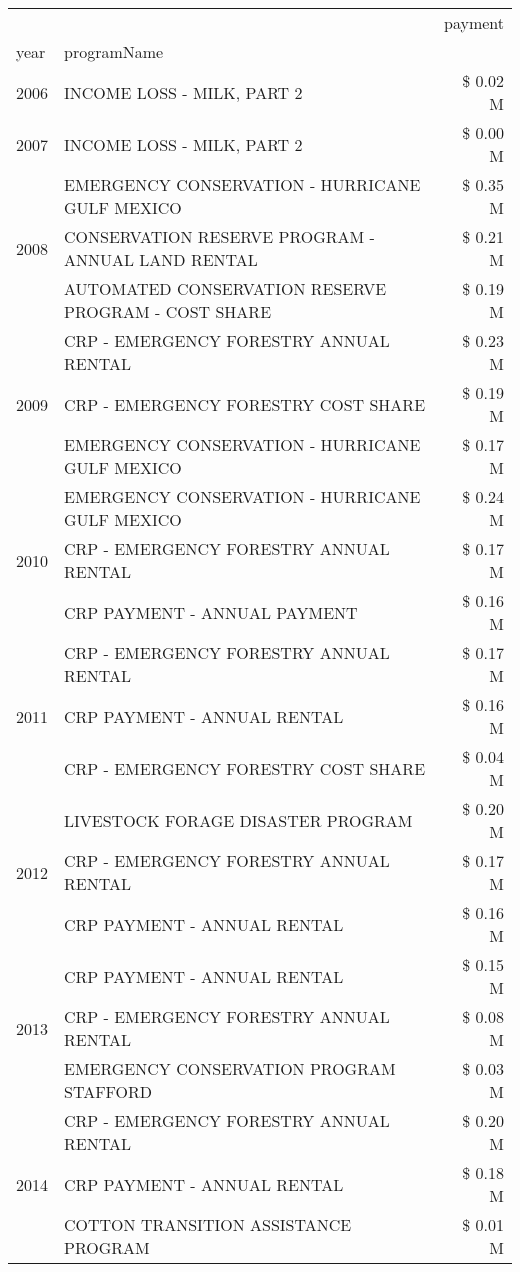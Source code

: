 \begin{tabular}{llr}
\toprule
 &  & payment \\
year & programName &  \\
\midrule
2006 & INCOME LOSS - MILK, PART 2 & \$ 0.02 M \\
\cline{1-3}
2007 & INCOME LOSS - MILK, PART 2 & \$ 0.00 M \\
\cline{1-3}
\multirow[t]{3}{*}{2008} & EMERGENCY CONSERVATION - HURRICANE GULF MEXICO & \$ 0.35 M \\
 & CONSERVATION RESERVE PROGRAM - ANNUAL LAND RENTAL & \$ 0.21 M \\
 & AUTOMATED CONSERVATION RESERVE PROGRAM - COST SHARE & \$ 0.19 M \\
\cline{1-3}
\multirow[t]{3}{*}{2009} & CRP - EMERGENCY FORESTRY ANNUAL RENTAL & \$ 0.23 M \\
 & CRP - EMERGENCY FORESTRY COST SHARE & \$ 0.19 M \\
 & EMERGENCY CONSERVATION - HURRICANE GULF MEXICO & \$ 0.17 M \\
\cline{1-3}
\multirow[t]{3}{*}{2010} & EMERGENCY CONSERVATION - HURRICANE GULF MEXICO & \$ 0.24 M \\
 & CRP - EMERGENCY FORESTRY ANNUAL RENTAL & \$ 0.17 M \\
 & CRP PAYMENT - ANNUAL PAYMENT & \$ 0.16 M \\
\cline{1-3}
\multirow[t]{3}{*}{2011} & CRP - EMERGENCY FORESTRY ANNUAL RENTAL & \$ 0.17 M \\
 & CRP PAYMENT - ANNUAL RENTAL & \$ 0.16 M \\
 & CRP - EMERGENCY FORESTRY COST SHARE & \$ 0.04 M \\
\cline{1-3}
\multirow[t]{3}{*}{2012} & LIVESTOCK FORAGE DISASTER PROGRAM & \$ 0.20 M \\
 & CRP - EMERGENCY FORESTRY ANNUAL RENTAL & \$ 0.17 M \\
 & CRP PAYMENT - ANNUAL RENTAL & \$ 0.16 M \\
\cline{1-3}
\multirow[t]{3}{*}{2013} & CRP PAYMENT - ANNUAL RENTAL & \$ 0.15 M \\
 & CRP - EMERGENCY FORESTRY ANNUAL RENTAL & \$ 0.08 M \\
 & EMERGENCY CONSERVATION PROGRAM STAFFORD & \$ 0.03 M \\
\cline{1-3}
\multirow[t]{3}{*}{2014} & CRP - EMERGENCY FORESTRY ANNUAL RENTAL & \$ 0.20 M \\
 & CRP PAYMENT - ANNUAL RENTAL & \$ 0.18 M \\
 & COTTON TRANSITION ASSISTANCE PROGRAM & \$ 0.01 M \\

\end{tabular}
